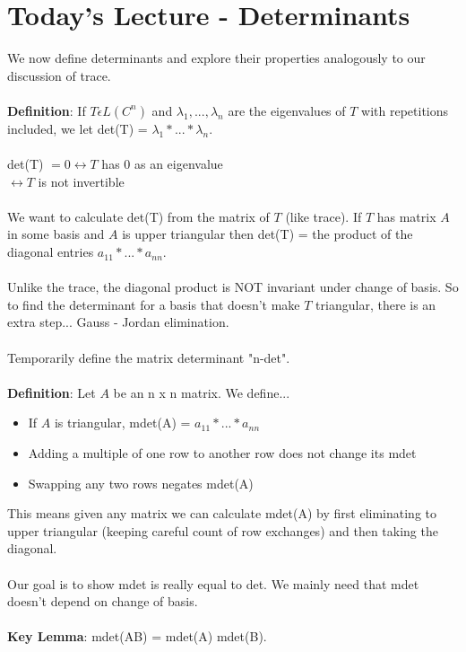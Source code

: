 \documentclass{article}
\begin{document}
\section{Today's Lecture - Determinants}
We now define determinants and explore their properties analogously to our discussion of trace. \\\\
\textbf{Definition}: If $T \epsilon L(C^n)$ and $\lambda_1, ..., \lambda_n$ are the eigenvalues of $T$ with repetitions included, we let det(T) = $\lambda_1 * ... * \lambda_n$. \\\\
det(T) $= 0 \leftrightarrow T$ has 0 as an eigenvalue \\
$\leftrightarrow T$ is not invertible \\\\
We want to calculate det(T) from the matrix of $T$ (like trace). If $T$ has matrix $A$ in some basis and $A$ is upper triangular then det(T) = the product of the diagonal entries $a_{11}*...*a_{nn}$. \\\\
Unlike the trace, the diagonal product is NOT invariant under change of basis. So to find the determinant for a basis that doesn't make $T$ triangular, there is an extra step... Gauss - Jordan elimination. \\\\
Temporarily define the matrix determinant "n-det". \\\\
\textbf{Definition}: Let $A$ be an n x n matrix. We define... 
\begin{itemize}
    \item If $A$ is triangular, mdet(A) = $a_{11} * ... * a_{nn}$
    \item Adding a multiple of one row to another row does not change its mdet 
    \item Swapping any two rows negates mdet(A)
\end{itemize}
This means given any matrix we can calculate mdet(A) by first eliminating to upper triangular (keeping careful count of row exchanges) and then taking the diagonal. \\\\
Our goal is to show mdet is really equal to det. We mainly need that mdet doesn't depend on change of basis. \\\\
\textbf{Key Lemma}: mdet(AB) = mdet(A) mdet(B). \\\\
\end{document}
